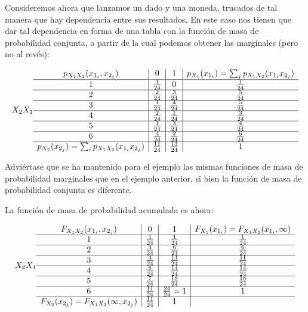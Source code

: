 \documentclass[11pt]{article}
\begin{document}
Consideremos ahora que lanzamos un dado y una moneda, trucados de tal
manera que hay dependencia entre sus resultados. En este caso nos tienen
que dar tal dependencia en forma de una tabla con la función de masa de
probabilidad conjunta, a partir de la cual podemos obtener las
marginales (pero no al revés):

\[
X_2 \\X_1 \begin{array}{c|c|c|c}
p_{X_1X_2}(x_{1_i}, x_{2_j}) & 0 & 1 & p_{X_1}(x_{1_i}) = \sum_j p_{X_1X_2}(x_{1_i}x_{2_j})\\
\hline
1 & \frac{1}{24} & 0 & \frac{1}{24}\\
\hline
2 & \frac{2}{24} & \frac{3}{24} & \frac{5}{24}\\
\hline
3 & \frac{1}{24} & \frac{4}{24} & \frac{5}{24}\\
\hline
4 & \frac{2}{24} & \frac{1}{24} & \frac{3}{24}\\
\hline
5 & \frac{1}{24} & \frac{3}{24} & \frac{4}{24}\\
\hline
6 & \frac{4}{24} & \frac{2}{24} & \frac{6}{24}\\
\hline
p_{X_2}(x_{2_j}) = \sum_i p_{X_1X_2}(x_{1_i}x_{2_j}) & \frac{11}{24} & \frac{13}{24} & 1
\end{array}
\]

Adviértase que se ha mantenido para el ejemplo las mismas funciones de
masa de probabilidad marginales que en el ejemplo anterior, si bien la
función de masa de probabilidad conjunta es diferente.

    La función de masa de probabilidad acumulada es ahora:

\[
X_2 \\X_1 \begin{array}{c|c|c|c}
F_{X_1X_2}(x_{1_i}, x_{2_j}) & 0 & 1 & F_{X_1}(x_{1_i}) = F_{X_1X_2}(x_{1_i}, \infty)\\
\hline
1 & \frac{1}{24} & \frac{1}{24} & \frac{1}{24}\\
\hline
2 & \frac{3}{24} & \frac{6}{24} & \frac{6}{24}\\
\hline
3 & \frac{4}{24} & \frac{11}{24} & \frac{11}{24}\\
\hline
4 & \frac{6}{24} & \frac{14}{24} & \frac{14}{24}\\
\hline
5 & \frac{7}{24} & \frac{18}{24} & \frac{18}{24}\\
\hline
6 & \frac{11}{24} & \frac{24}{24}=1 & 1\\
\hline
F_{X_2}(x_{2_j}) = F_{X_1X_2}(\infty, x_{2_j}) & \frac{11}{24} & 1 & 
\end{array}
\]
\end{document}
